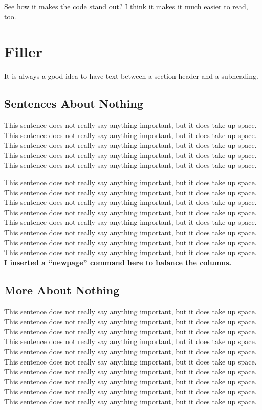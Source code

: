 \documentclass[final]{ieee}
\begin{document}
See how it makes the code stand out? I think it makes it
much easier to read, too.

\section{Filler}

It is always a good idea to have text between a section header and
a subheading.

\subsection{Sentences About Nothing}

This sentence does not really say anything important, but it does take up space.
This sentence does not really say anything important, but it does take up space.
This sentence does not really say anything important, but it does take up space.
This sentence does not really say anything important, but it does take up space.
This sentence does not really say anything important, but it does take up space.

This sentence does not really say anything important, but it does take up space.
This sentence does not really say anything important, but it does take up space.
This sentence does not really say anything important, but it does take up space.
This sentence does not really say anything important, but it does take up space.
This sentence does not really say anything important, but it does take up space.
This sentence does not really say anything important, but it does take up space.
This sentence does not really say anything important, but it does take up space.
This sentence does not really say anything important, but it does take up space.
{\bf I inserted a ``newpage'' command here to balance the columns.}

\newpage

\subsection{More About Nothing}

This sentence does not really say anything important, but it does take up space.
This sentence does not really say anything important, but it does take up space.
This sentence does not really say anything important, but it does take up space.
This sentence does not really say anything important, but it does take up space.
This sentence does not really say anything important, but it does take up space.
This sentence does not really say anything important, but it does take up space.
This sentence does not really say anything important, but it does take up space.
This sentence does not really say anything important, but it does take up space.
This sentence does not really say anything important, but it does take up space.
This sentence does not really say anything important, but it does take up space.
\end{document}
